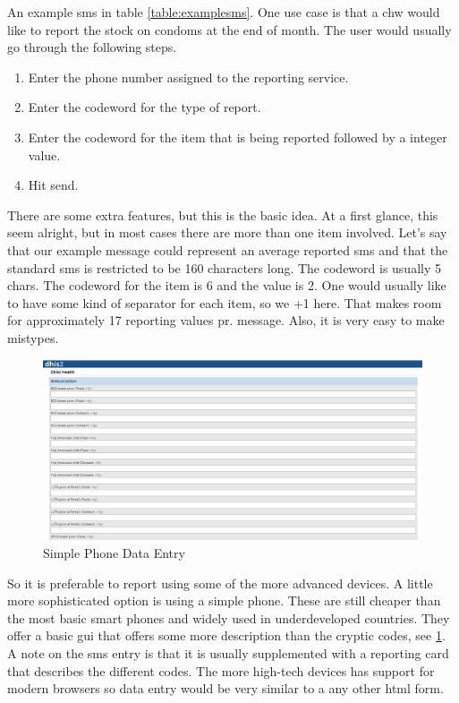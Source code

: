 An example \gls{sms} in table \ref{table:examplesms}. 
One use case is that a \gls{chw} would like to report the stock on condoms at the end of month. 
The user would usually go through the following steps.
\begin{enumerate}
\item Enter the phone number assigned to the reporting service.
\item Enter the codeword for the type of report.
\item Enter the codeword for the item that is being reported followed by a integer value.
\item Hit send.
\end{enumerate}
There are some extra features, but this is the basic idea. 
At a first glance, this seem alright, but in most cases there are more than one item involved. 
Let's say that our example message could represent an average reported \gls{sms} and that the standard \gls{sms} is restricted to be 160 characters long. 
The codeword is usually 5 chars. 
The codeword for the item is 6 and the value is 2. 
One would usually like to have some kind of separator for each item, so we +1 here. 
That makes room for approximately 17 reporting values pr. message. 
Also, it is very easy to make mistypes. 
\begin{figure}
\centering
\includegraphics[width=\textwidth]{context/img/lightDataEntry}
\caption{Simple Phone Data Entry}
\label{fig:simplephone}
\end{figure}
So it is preferable to report using some of the more advanced devices. 
A little more sophisticated option is using a simple phone. 
These are still cheaper than the most basic smart phones and widely used in underdeveloped countries. 
They offer a basic \gls{gui} that offers some more description than the cryptic codes, see \ref{fig:simplephone}. 
A note on the \gls{sms} entry is that it is usually supplemented with a reporting card that describes the different codes. 
The more high-tech devices has support for modern browsers so data entry would be very similar to a any other \gls{html} form. 

